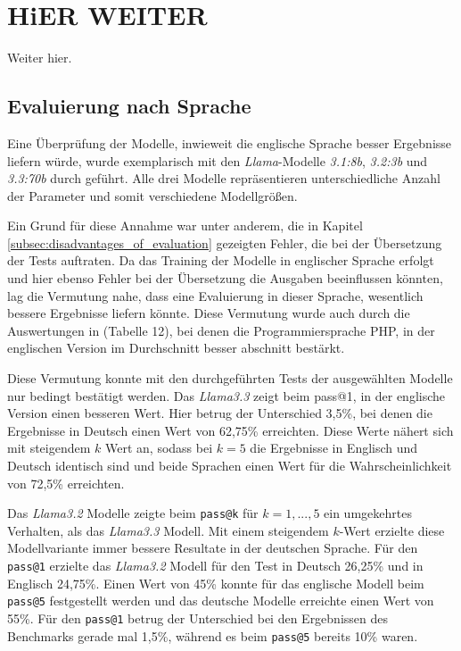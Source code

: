 \section{HiER WEITER}
Weiter hier.

\subsection{Evaluierung nach Sprache}
Eine Überprüfung der Modelle, inwieweit die englische Sprache besser Ergebnisse liefern würde, wurde exemplarisch mit den \textit{Llama}-Modelle \textit{3.1:8b}, \textit{3.2:3b} und \textit{3.3:70b} durch geführt. Alle drei Modelle repräsentieren unterschiedliche Anzahl der Parameter und somit verschiedene Modellgrößen.\vspace{0.2cm}

Ein Grund für diese Annahme war unter anderem, die in Kapitel \ref{subsec:disadvantages_of_evaluation} gezeigten Fehler, die bei der Übersetzung der Tests auftraten. Da das Training der Modelle in englischer Sprache erfolgt und hier ebenso Fehler bei der Übersetzung die Ausgaben beeinflussen könnten, lag die Vermutung nahe, dass eine Evaluierung in dieser Sprache, wesentlich bessere Ergebnisse liefern könnte. Diese Vermutung wurde auch durch die Auswertungen in \cite[][11]{peng-2024} (Tabelle 12), bei denen die Programmiersprache PHP, in der englischen Version im Durchschnitt besser abschnitt bestärkt.\vspace{0.2cm}

Diese Vermutung konnte mit den durchgeführten Tests der ausgewählten Modelle nur bedingt bestätigt werden. Das \textit{Llama3.3} zeigt beim pass@1, in der englische Version einen besseren Wert. Hier betrug der Unterschied 3,5\%, bei denen die Ergebnisse in Deutsch einen Wert von 62,75\% erreichten. Diese Werte nähert sich mit steigendem $k$ Wert an, sodass bei $k=5$ die Ergebnisse in Englisch und Deutsch identisch sind und beide Sprachen einen Wert für die Wahrscheinlichkeit von 72,5\% erreichten.\vspace{0.2cm}

Das \textit{Llama3.2} Modelle zeigte beim \texttt{pass@k} für $k=1,...,5$ ein umgekehrtes Verhalten, als das \textit{Llama3.3} Modell. Mit einem steigendem $k$-Wert erzielte diese Modellvariante immer bessere Resultate in der deutschen Sprache. Für  den \texttt{pass@1} erzielte das \textit{Llama3.2} Modell für den Test in Deutsch 26,25\% und in Englisch 24,75\%. Einen Wert von 45\% konnte für das englische Modell beim \texttt{pass@5} festgestellt werden und das deutsche Modelle erreichte einen Wert von 55\%. Für den \texttt{pass@1} betrug der Unterschied bei den Ergebnissen des Benchmarks gerade mal 1,5\%, während es beim \texttt{pass@5} bereits 10\% waren.\vspace{0.2cm}


